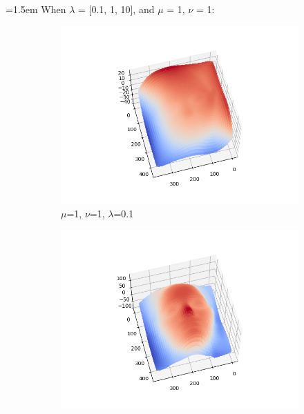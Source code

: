 \documentclass{article}
\begin{document}
	\hangindent=1.5em \hspace{1.5em}When $\lambda$ = [0.1, 1, 10], and $\mu$ = 1, $\nu$ = 1: \\
\begin{figure}[H]
	\centering
	\begin{subfigure}{0.33\textwidth}
		\centering
		\includegraphics[width=\textwidth]{./src/2f_lambda_change/faceCalibrated_mu_1_v_1_lambda_0.1.png}
		\caption{$\mu$=1, $\nu$=1, $\lambda$=0.1}
	\end{subfigure}
	\hfill
	\begin{subfigure}{0.32\textwidth}
		\centering
		\includegraphics[width=\textwidth]{./src/2f_lambda_change/faceCalibrated_mu_1_v_1_lambda_1.png}

\end{subfigure}
\end{figure}
\end{document}

